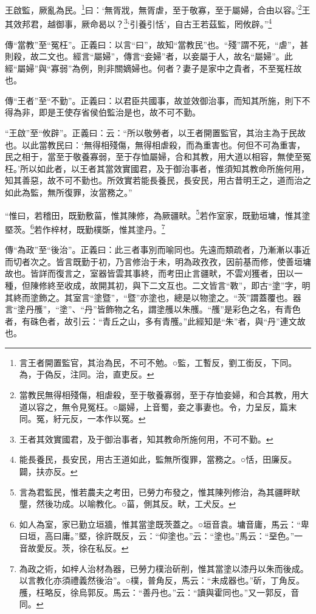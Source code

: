 王啟監，厥亂為民。\footnote{言王者開置監官，其治為民，不可不勉。○監，工暫反，劉工銜反，下同。為，于偽反，注同。治，直吏反。}曰：‘無胥戕，無胥虐，至于敬寡，至于屬婦，合由以容。’\footnote{當教民無得相殘傷，相虐殺，至于敬養寡弱，至于存恤妾婦，和合其教，用大道以容之，無令見冤枉。○屬婦，上音蜀，妾之事妻也。令，力呈反，篇末同。冤，紆元反，一本作以冤。}王其效邦君，越御事，厥命曷以？\footnote{王者其效實國君，及于御治事者，知其教命所施何用，不可不勤。}‘引養引恬’，自古王若茲監，罔攸辟。”\footnote{能長養民，長安民，用古王道如此，監無所復罪，當務之。○恬，田廉反。闢，扶亦反。}

{\noindent\zhuan{}\fzbyks 傳“當教”至“冤枉”。正義曰：以言“曰”，故知“當教民”也。“殘”謂不死，“虐”，甚則殺，故二文也。經言“屬婦”，傳言“妾婦”者，以妾屬于人，故名“屬婦”。此經“屬婦”與“寡弱”為例，則非關嫡婦也。何者？妻子是家中之貴者，不至冤枉故也。 \par}

{\noindent\zhuan{}\fzbyks 傳“王者”至“不勤”。正義曰：以君臣共國事，故並效御治事，而知其所施，則下不得為非，即是王使存省侯伯監治是也，故不可不勤。 \par}

{\noindent\shu{}\fzkt “王啟”至“攸辟”。正義曰：云：“所以敬勞者，以王者開置監官，其治主為于民故也。以此當教民曰：‘無得相殘傷，無得相虐殺，而為重害也。何但不可為重害，民之相于，當至于敬養寡弱，至于存恤屬婦，合和其教，用大道以相容，無使至冤枉。’所以如此者，以王者其當效實國君，及于御治事者，惟須知其教命所施何用，知其善惡，故不可不勤也。所效實若能長養民，長安民，用古昔明王之，道而治之如此為監，無所復罪，汝當務之。” \par}

“惟曰，若稽田，既勤敷菑，惟其陳修，為厥疆畎。\footnote{言為君監民，惟若農夫之考田，已勞力布發之，惟其陳列修治，為其疆畔畎壟，然後功成。以喻教化。○菑，側其反。畎，工犬反。}若作室家，既勤垣墉，惟其塗塈茨。\footnote{如人為室，家已勤立垣牆，惟其當塗既茨蓋之。○垣音袁。墉音庸，馬云：“卑曰垣，高曰庸。”塈，徐許既反，云：“仰塗也。”云：“塗也。”馬云：“堊色。”一音故愛反。茨，徐在私反。}若作梓材，既勤樸斲，惟其塗丹。\footnote{為政之術，如梓人治材為器，已勞力樸治斫削，惟其當塗以漆丹以朱而後成。以言教化亦須禮義然後治”。○樸，普角反，馬云：“未成器也。”斫，丁角反。雘，枉略反，徐烏郭反。馬云：“善丹也。”云：“讀與霍同也。”又一郭反，音同。}


{\noindent\zhuan{}\fzbyks 傳“為政”至“後治”。正義曰：此三者事別而喻同也。先遠而類疏者，乃漸漸以事近而切者次之。皆言既勤于初，乃言修治于未，明為政孜孜，因前基而修，使善垣墉故也。皆詳而復言之，室器皆雲其事終，而考田止言疆畎，不雲刈獲者，田以一種，但陳修終至收成，故開其初，與下二文互也。二文皆言“斁”，即古“塗”字，明其終而塗飾之。其室言“塗暨”，“暨”亦塗也，總是以物塗之。“茨”謂蓋覆也。器言“塗丹雘”，“塗”、“丹”皆飾物之名，謂塗雘以朱雘。“雘”是彩色之名，有青色者，有硃色者，故引云：“青丘之山，多有青雘。”此經知是“朱”者，與“丹”連文故也。 \par}

